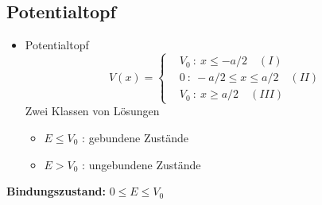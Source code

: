 \documentclass[10pt,article,colorback,accentcolor=tud9d]{scrartcl}
\begin{document}
\subsection{Potentialtopf}
\label{topf}
\begin{itemize}
  \item Potentialtopf
    \begin{equation}
    V(x)=\left\{
    \begin{aligned}
    &V_0 \ : \ x\leq -a/2 \quad (I)\\
    &0 \ : \ -a/2\leq x\leq a/2 \quad (II) \\
    &V_0 \ : \ x\geq a/2 \quad (III)
    \end{aligned}
    \right.
    \end{equation}
    Zwei Klassen von Lösungen
    \begin{itemize}
      \item $E\leq V_0$ : gebundene Zustände
      \item $E>V_0$ : ungebundene Zustände
    \end{itemize}
    \end{itemize}
    \textbf{Bindungszustand:} $0\leq E \leq V_0$
\end{document}
